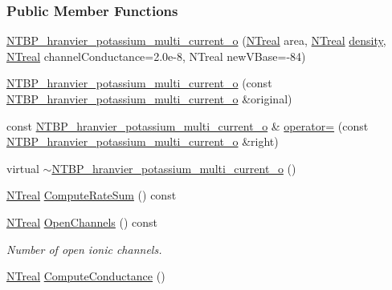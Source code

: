 \subsubsection*{Public Member Functions}
\begin{DoxyCompactItemize}
\item 
\hyperlink{class_n_t_b_p__hranvier__potassium__multi__current__o_a3cca7ddf1f90d76fb353e82adb835599}{NTBP\_\-hranvier\_\-potassium\_\-multi\_\-current\_\-o} (\hyperlink{nt__types_8h_a814a97893e9deb1eedcc7604529ba80d}{NTreal} area, \hyperlink{nt__types_8h_a814a97893e9deb1eedcc7604529ba80d}{NTreal} \hyperlink{class_n_t_b_p__multi__current__o_a82138baaa276b09c13038ca1fd6f08a7}{density}, \hyperlink{nt__types_8h_a814a97893e9deb1eedcc7604529ba80d}{NTreal} channelConductance=2.0e-\/8, NTreal newVBase=-\/84)
\item 
\hyperlink{class_n_t_b_p__hranvier__potassium__multi__current__o_a581b94cefd791205e488baed3397acfb}{NTBP\_\-hranvier\_\-potassium\_\-multi\_\-current\_\-o} (const \hyperlink{class_n_t_b_p__hranvier__potassium__multi__current__o}{NTBP\_\-hranvier\_\-potassium\_\-multi\_\-current\_\-o} \&original)
\item 
const \hyperlink{class_n_t_b_p__hranvier__potassium__multi__current__o}{NTBP\_\-hranvier\_\-potassium\_\-multi\_\-current\_\-o} \& \hyperlink{class_n_t_b_p__hranvier__potassium__multi__current__o_ad1db437e5ecbad38a04a94d6259ba249}{operator=} (const \hyperlink{class_n_t_b_p__hranvier__potassium__multi__current__o}{NTBP\_\-hranvier\_\-potassium\_\-multi\_\-current\_\-o} \&right)
\item 
virtual \hyperlink{class_n_t_b_p__hranvier__potassium__multi__current__o_ae115f15cb9e33189995ba043c0323a44}{$\sim$NTBP\_\-hranvier\_\-potassium\_\-multi\_\-current\_\-o} ()
\item 
\hyperlink{nt__types_8h_a814a97893e9deb1eedcc7604529ba80d}{NTreal} \hyperlink{class_n_t_b_p__hranvier__potassium__multi__current__o_a7f0d30112449fabe5ea84f112e208ac9}{ComputeRateSum} () const 
\item 
\hyperlink{nt__types_8h_a814a97893e9deb1eedcc7604529ba80d}{NTreal} \hyperlink{class_n_t_b_p__hranvier__potassium__multi__current__o_a9a0b45297d1d8292cd840b38384a7c84}{OpenChannels} () const 
\begin{DoxyCompactList}\small\item\em Number of open ionic channels. \item\end{DoxyCompactList}\item 
\hyperlink{nt__types_8h_a814a97893e9deb1eedcc7604529ba80d}{NTreal} \hyperlink{class_n_t_b_p__hranvier__potassium__multi__current__o_a38e3750bd2ddea5b2aa1636e5d082549}{ComputeConductance} ()

\end{DoxyCompactItemize}
